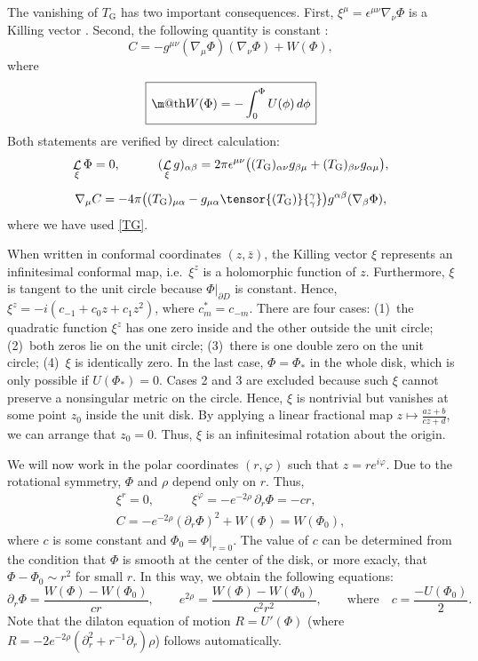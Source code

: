 \documentclass[12pt]{article}
\makeatletter
\newcommand*{\wideboxed}[1]{\setlength{\fboxsep}{1ex}%
  \fbox{\m@th$\displaystyle#1$}}
\newcommand{\ph}{\varphi}
\DeclareMathOperator{\Ld}{\mathcal{L}}
\newcommand{\Grav}{\mathrm{G}}
\def\ie{i.e.\ }
\makeatother
\begin{document}
The vanishing of $T_{\Grav}$ has two important consequences. First, $\xi^{\mu} =\epsilon^{\mu\nu}\nabla_{\nu}\Phi$ is a Killing vector \cite{BaOL91}. Second, the following quantity is constant \cite{L-MKu94}:
\begin{equation}
C=-g^{\mu\nu}(\nabla_{\mu}\Phi)(\nabla_{\nu}\Phi)+W(\Phi),
\end{equation}
where
\begin{equation}
\wideboxed{
W(\Phi)=-\int_{0}^{\Phi}U(\phi)\,d\phi
}
\end{equation}
Both statements are verified by direct calculation:
\begin{gather}
\Ld_{\xi}\Phi=0,\qquad\quad
(\Ld_{\xi}g)_{\alpha\beta}
=2\pi\epsilon^{\mu\nu} \bigl((T_{\Grav})_{\alpha\nu}g_{\beta\mu}
+(T_{\Grav})_{\beta\nu}g_{\alpha\mu}\bigr),\\[5pt]
\nabla_{\mu}C
=-4\pi\bigl(
(T_{\Grav})_{\mu\alpha}-g_{\mu\alpha}\tensor{(T_{\Grav})}{^\gamma_\gamma}
\bigr) g^{\alpha\beta}(\nabla_{\beta}\Phi),
\end{gather}
where we have used \eqref{TG}.

When written in conformal coordinates $(z,\bar{z})$, the Killing vector $\xi$ represents an infinitesimal conformal map, \ie $\xi^{z}$ is a holomorphic function of $z$. Furthermore, $\xi$ is tangent to the unit circle because $\Phi|_{\partial D}$ is constant. Hence, $\xi^z=-i(c_{-1}+c_{0}z+c_{1}z^2)$, where $c_{m}^*=c_{-m}$. There are four cases: (1)~the quadratic function $\xi^z$ has one zero inside and the other outside the unit circle; (2)~both zeros lie on the unit circle; (3)~there is one double zero on the unit circle; (4)~$\xi$ is identically zero. In the last case, $\Phi=\Phi_*$ in the whole disk, which is only possible if $U(\Phi_*)=0$. Cases 2 and 3 are excluded because such $\xi$ cannot preserve a nonsingular metric on the circle. Hence, $\xi$ is nontrivial but vanishes at some point $z_0$ inside the unit disk. By applying a linear fractional map $z\mapsto\frac{az+b}{cz+d}$, we can arrange that $z_0=0$. Thus, $\xi$ is an infinitesimal rotation about the origin.

We will now work in the polar coordinates $(r,\ph)$ such that $z=re^{i\ph}$. Due to the rotational symmetry, $\Phi$ and $\rho$ depend only on $r$. Thus, \begin{gather}
\xi^{r}=0,\qquad\quad
\xi^{\ph}=-e^{-2\rho}\,\partial_{r}\Phi
=-cr,\\[5pt]
C=-e^{-2\rho}(\partial_{r}\Phi)^2+W(\Phi)=W(\Phi_0),
\end{gather}
where $c$ is some constant and $\Phi_0=\Phi|_{r=0}$. The value of $c$ can be determined from the condition that $\Phi$ is smooth at the center of the disk, or more exacly, that $\Phi-\Phi_0\sim r^2$ for small $r$. In this way, we obtain the following equations:
\begin{equation}
\partial_{r}\Phi=\frac{W(\Phi)-W(\Phi_0)}{cr},\qquad
e^{2\rho}=\frac{W(\Phi)-W(\Phi_0)}{c^2r^2},\qquad
\text{where}\quad c=\frac{-U(\Phi_0)}{2}.
\end{equation}
Note that the dilaton equation of motion $R=U'(\Phi)$ (where $R=-2e^{-2\rho}(\partial_{r}^2 +r^{-1}\partial_{r})\rho$) follows automatically.
\end{document}
